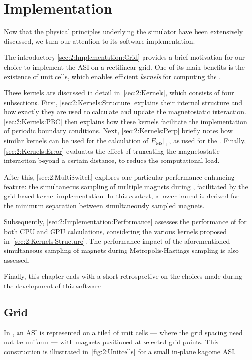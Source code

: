 \newpage
\section{Implementation}\label{sec:2:Implementation}
Now that the physical principles underlying the simulator have been extensively discussed, we turn our attention to its software implementation. \par
The introductory \cref{sec:2:Implementation:Grid} provides a brief motivation for our choice to implement the ASI on a rectilinear grid.
One of its main benefits is the existence of unit cells, which enables efficient \textit{kernels} for computing the . \par
These kernels are discussed in detail in~\cref{sec:2:Kernels}, which consists of four subsections.
First, \cref{sec:2:Kernels:Structure} explains their internal structure and how exactly they are used to calculate and update the magnetostatic interaction.
\cref{sec:2:Kernels:PBC} then explains how these kernels facilitate the implementation of periodic boundary conditions.
Next, \cref{sec:2:Kernels:Perp} briefly notes how similar kernels can be used for the calculation of $\left. E_{\mathrm{MS}} \right|_{\perp}$, as used for the .
Finally, \cref{sec:2:Kernels:Error} evaluates the effect of truncating the magnetostatic interaction beyond a certain distance, to reduce the computational load. \par
After this, \cref{sec:2:MultiSwitch} explores one particular performance-enhancing feature: the simultaneous sampling of multiple magnets during , facilitated by the grid-based kernel implementation.
In this context, a lower bound is derived for the minimum separation between simultaneously sampled magnets. \par
Subsequently, \cref{sec:2:Implementation:Performance} assesses the performance of \hotspice for both CPU and GPU calculations, considering the various kernels proposed in~\cref{sec:2:Kernels:Structure}.
The performance impact of the aforementioned simultaneous sampling of magnets during Metropolis-Hastings sampling is also assessed. \par
Finally, this chapter ends with a short retrospective on the choices made during the development of this software.

\subsection{Grid}\label{sec:2:Implementation:Grid}
In \hotspice, an ASI is represented on a tiled  of unit cells --- where the grid spacing need not be uniform --- with magnets positioned at selected grid points.
This construction is illustrated in~\cref{fig:2:Unitcells} for a small in-plane kagome ASI.

